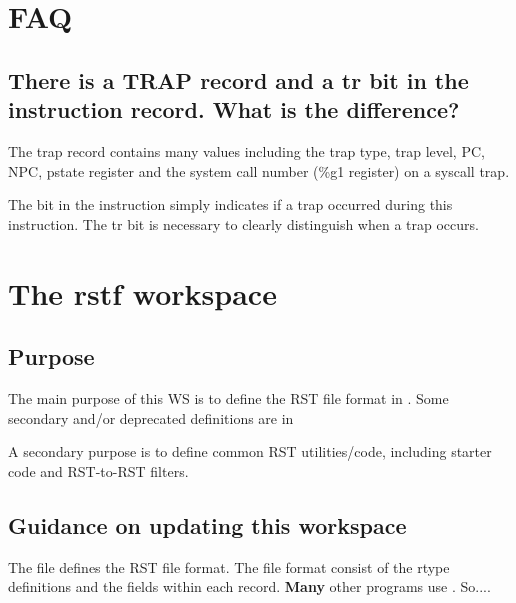 \documentclass[10pt]{article}
\begin{document}
\section{FAQ}

\subsection{There is a TRAP record and a tr bit in the instruction record.  What is the difference?}

The trap record contains many values including the trap type, trap
level, PC, NPC, pstate register and the system call number (\%g1
register) on a syscall trap.

The  bit in the instruction simply indicates if a trap
occurred during this instruction.  The tr bit is necessary to clearly
distinguish when a trap occurs.

\section{The rstf workspace}

\subsection{Purpose}

\begin{rqenumerate}{0em}
  \item The main purpose of this WS is to define the RST file format in
  .
   Some secondary and/or deprecated definitions are in

  \item A secondary purpose is to define common RST utilities/code, including
   starter code and RST-to-RST filters.
\end{rqenumerate}

\subsection{Guidance on updating this workspace}

The file  defines the RST file format.  The file format
consist of the rtype definitions and the fields within each record.
\textbf{Many} other programs use .  So....
\end{document}
